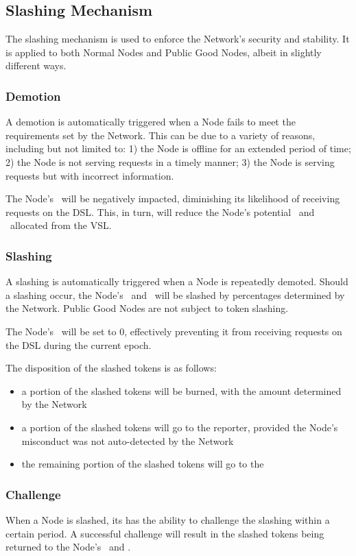 \subsection{Slashing Mechanism}

The slashing mechanism is used to enforce the Network's security and stability.
It is applied to both Normal Nodes and Public Good Nodes, albeit in slightly different ways.

\subsubsection{Demotion}
A demotion is automatically triggered when a Node fails to meet the requirements set by the Network.
This can be due to a variety of reasons, including but not limited to: 1) the Node is offline for an extended period of time; 2) the Node is not serving requests in a timely manner; 3) the Node is serving requests but with incorrect information.

The Node's \reliabilityScore\ will be negatively impacted, diminishing its likelihood of receiving requests on the \gls{DSL}.
This, in turn, will reduce the Node's potential \operationReward\ and \stakingReward\ allocated from the \gls{VSL}.


\subsubsection{Slashing}

A slashing is automatically triggered when a Node is repeatedly demoted.
Should a slashing occur, the Node's \operationPool\ and \stakingPool\ will be slashed by percentages determined by the Network. Public Good Nodes are not subject to token slashing.

The Node's \reliabilityScore\ will be set to 0, effectively preventing it from receiving requests on the \gls{DSL} during the current epoch.

The disposition of the slashed tokens is as follows:
\begin{itemize}
    \item a portion of the slashed tokens will be burned, with the amount determined by the Network
    \item a portion of the slashed tokens will go to the reporter, provided the Node’s misconduct was not auto-detected by the Network
    \item the remaining portion of the slashed tokens will go to the \publicGoodPool
\end{itemize}

\subsubsection{Challenge}
When a Node is slashed, its  has the ability to challenge the slashing within a certain period. A successful challenge will result in the slashed tokens being returned to the Node's \operationPool\ and \stakingPool.